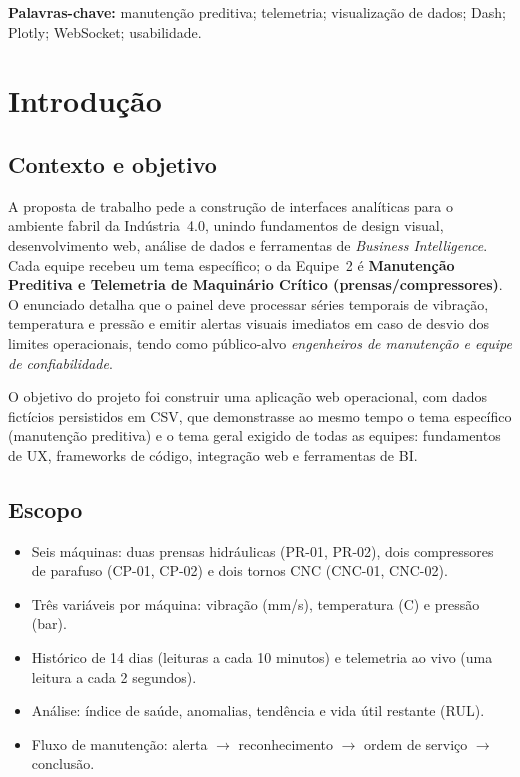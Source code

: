 \documentclass[12pt,a4paper]{article}
\begin{document}
\medskip
\noindent\textbf{Palavras-chave:} manutenção preditiva; telemetria; visualização de dados; Dash; Plotly; WebSocket; usabilidade.

\newpage
\section{Introdução}
\subsection{Contexto e objetivo}
A proposta de trabalho pede a construção de interfaces analíticas para o ambiente fabril da Indústria~4.0, unindo fundamentos de design visual,
desenvolvimento web, análise de dados e ferramentas de \emph{Business Intelligence}. Cada equipe recebeu um tema específico; o da Equipe~2 é
\textbf{Manutenção Preditiva e Telemetria de Maquinário Crítico (prensas/compressores)}. O enunciado detalha que o painel deve processar séries
temporais de vibração, temperatura e pressão e emitir alertas visuais imediatos em caso de desvio dos limites operacionais, tendo como público-alvo
\emph{engenheiros de manutenção e equipe de confiabilidade}.

O objetivo do projeto foi construir uma aplicação web operacional, com dados fictícios persistidos em CSV, que demonstrasse ao mesmo tempo o tema
específico (manutenção preditiva) e o tema geral exigido de todas as equipes: fundamentos de UX, frameworks de código, integração web e ferramentas de BI.

\subsection{Escopo}
\begin{itemize}
  \item Seis máquinas: duas prensas hidráulicas (PR-01, PR-02), dois compressores de parafuso (CP-01, CP-02) e dois tornos CNC (CNC-01, CNC-02).
  \item Três variáveis por máquina: vibração (mm/s), temperatura (\textdegree C) e pressão (bar).
  \item Histórico de 14 dias (leituras a cada 10 minutos) e telemetria ao vivo (uma leitura a cada 2 segundos).
  \item Análise: índice de saúde, anomalias, tendência e vida útil restante (RUL).
  \item Fluxo de manutenção: alerta $\rightarrow$ reconhecimento $\rightarrow$ ordem de serviço $\rightarrow$ conclusão.
\end{itemize}
\end{document}
